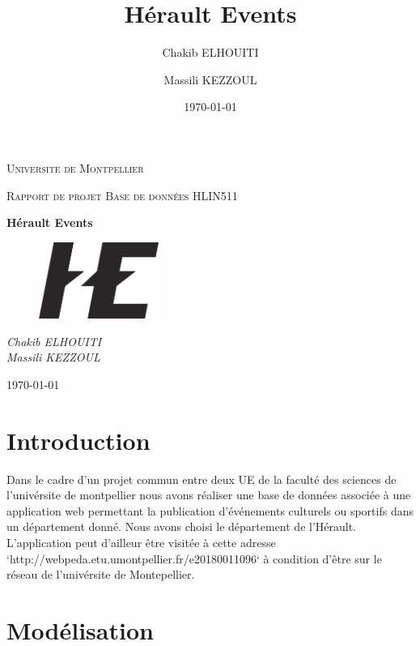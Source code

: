 \documentclass[oneside,11pt,a4paper]{article}
\title{Hérault Events}
\author{
    Chakib ELHOUITI \and
    Massili KEZZOUL 
}
\date{\today}
\begin{document}
\begin{titlepage}
	\centering
	{\scshape\LARGE Universite de Montpellier\par}
	{\scshape\Large Rapport de projet Base de données HLIN511\par}
	\vspace{1.5cm}
	{\huge\bfseries Hérault Events\par}
	\vspace{2cm}
	\begin{figure}[h]
		\centering
		\includegraphics[width=0.35\textwidth]{../../view/img/logo/HE-noir.png}
	\end{figure}
	\vspace{2cm}
	{\Large\itshape
		Chakib ELHOUITI \\
		Massili KEZZOUL \\
		\par}

	\vspace{1.5cm}


	
\vfill
	{\large \today\par}
\end{titlepage}
\section{Introduction}

Dans le cadre d'un projet commun entre deux UE de la faculté des sciences de l'univérsite de montpellier nous avons réaliser une base de données associée à une application web permettant la publication d’événements culturels ou sportifs dans un département donné. Nous avons choisi le département de l'Hérault. L'application peut d'ailleur être visitée à cette adresse `http://webpeda.etu.umontpellier.fr/e20180011096` à condition d'être sur le réseau de l'univérsite de Montepellier.

\section{Modélisation}
\end{document}
